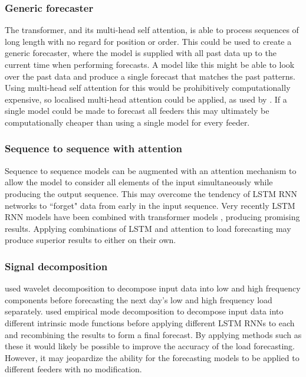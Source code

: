 \subsubsection{Generic forecaster}
The transformer, and its multi-head self attention, is able to process sequences of long length with no regard for position or order.
This could be used to create a generic forecaster, where the model is supplied with all past data up to the current time when performing forecasts.
A model like this might be able to look over the past data and produce a single forecast that matches the past patterns.
Using multi-head self attention for this would be prohibitively computationally expensive, so localised multi-head attention \cite{Vaswani2017} could be applied, as used by \citet{Song2017}.
If a single model could be made to forecast all feeders this may ultimately be computationally cheaper than using a single model for every feeder.

\subsubsection{Sequence to sequence with attention}
Sequence to sequence models can be augmented with an attention mechanism \cite{luong2015effective} to allow the model to consider all elements of the input simultaneously while producing the output sequence.
This may overcome the tendency of LSTM RNN networks to ``forget" data from early in the input sequence.
Very recently LSTM RNN models have been combined with transformer models \cite{chen2018best}, producing promising results.
Applying combinations of LSTM and attention to load forecasting may produce superior results to either on their own.

\subsubsection{Signal decomposition}
\citet{Chen2010} used wavelet decomposition to decompose input data into low and high frequency components before forecasting the next day's low and high frequency load separately.
\citet{Bedi2018} used empirical mode decomposition to decompose input data into different intrinsic mode functions before applying different LSTM RNNs to each and recombining the results to form a final forecast.
By applying methods such as these it would likely be possible to improve the accuracy of the load forecasting.
However, it may jeopardize the ability for the forecasting models to be applied to different feeders with no modification.

